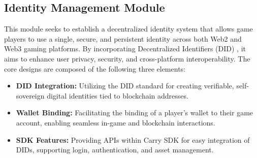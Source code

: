\subsection{Identity Management Module}

This module seeks to establish a decentralized identity system that allows game players to use a single, secure, and persistent identity across both Web2 and Web3 gaming platforms. By incorporating Decentralized Identifiers (DID) \cite{reed2020decentralized}, it aims to enhance user privacy, security, and cross-platform interoperability. The core designs are composed of the following three elements:
\begin{itemize}
    \item \textbf{DID Integration:} Utilizing the DID standard for creating verifiable, self-sovereign digital identities tied to blockchain addresses.
\item \textbf{Wallet Binding:} Facilitating the binding of a player’s wallet to their game account, enabling seamless in-game and blockchain interactions.
\item \textbf{SDK Features:} Providing APIs within Carry SDK for easy integration of DIDs, supporting login, authentication, and asset management.
\end{itemize}

